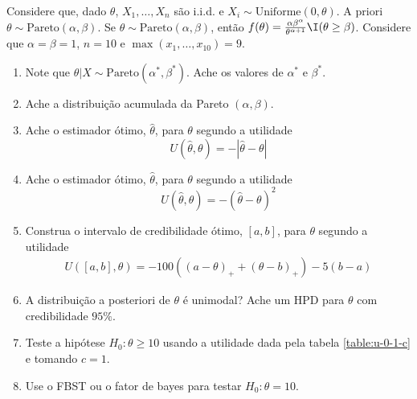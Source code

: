 \begin{exercise}
 Considere que, dado $\theta$, 
 $X_{1},\ldots,X_{n}$ são i.i.d. e
 $X_{i} \sim \text{Uniforme}(0,\theta)$.
 A priori $\theta \sim \text{Pareto}(\alpha,\beta)$.
 Se $\theta \sim \text{Pareto}(\alpha,\beta)$, então 
 $f(\theta) = \frac{\alpha \beta^{\alpha}}{\theta^{\alpha+1}}\I(\theta \geq \beta)$.
 Considere que $\alpha=\beta=1$, $n=10$ e 
 $\max(x_{1},\ldots,x_{10}) = 9$.
 \begin{enumerate}[label=(\alph*)]
  \item Note que 
  $\theta|X \sim \text{Pareto}(\alpha^{*},\beta^{*})$.
  Ache os valores de $\alpha^{*}$ e $\beta^{*}$.
  \item Ache a distribuição acumulada 
  da Pareto $(\alpha,\beta)$.
  \item Ache o estimador ótimo, $\hat{\theta}$, 
  para $\theta$ segundo a utilidade 
  $$U(\hat{\theta},\theta) = -|\hat{\theta}-\theta|$$
  \item Ache o estimador ótimo, $\hat{\theta}$, 
  para $\theta$ segundo a utilidade 
  $$U(\hat{\theta},\theta) = -(\hat{\theta}-\theta)^{2}$$
  \item Construa o intervalo de credibilidade ótimo, 
  $[a,b]$, para $\theta$ segundo a utilidade 
  \begin{align*}
   U([a,b],\theta) 
   =-100((a-\theta)_{+}+(\theta-b)_{+})-5(b-a)
  \end{align*}
  \item A distribuição a posteriori de $\theta$ é unimodal?
  Ache um HPD para $\theta$ com credibilidade $95\%$.
  \item Teste a hipótese $H_{0}:\theta \geq 10$ usando 
  a utilidade dada pela tabela \ref{table:u-0-1-c} e 
  tomando $c=1$.
  \item Use o FBST ou o fator de bayes para 
  testar $H_{0}: \theta=10$.
 \end{enumerate}
\end{exercise}

